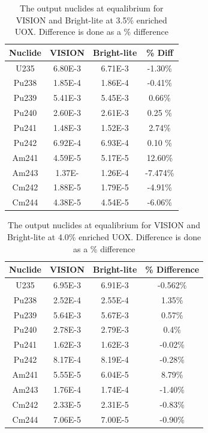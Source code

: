 \documentclass{article}
\begin{document}
\begin{table}[!htb]
\centering
\small
\caption{The output nuclides at equalibrium for VISION and Bright-lite at 3.5\% enriched UOX. Difference is done as a \% difference}
\label{tab:35}
\vspace{0.5em}
\begin{tabular}{cccc}
Nuclide &  VISION & Bright-lite & \% Diff \\
\hline
U235  & 6.80E-3 & 6.71E-3 & -1.30\%\\
Pu238 & 1.85E-4 & 1.86E-4 & -0.41\%\\
Pu239 & 5.41E-3 & 5.45E-3 & 0.66\%\\
Pu240 & 2.60E-3 & 2.61E-3 & 0.25 \%\\
Pu241 & 1.48E-3 & 1.52E-3 & 2.74\%\\
Pu242 & 6.92E-4 & 6.93E-4 & 0.10 \%\\
Am241 & 4.59E-5 & 5.17E-5 & 12.60\%\\
Am243 & 1.37E- & 1.26E-4 & -7.474\%\\
Cm242 & 1.88E-5 & 1.79E-5 & -4.91\%\\
Cm244 & 4.38E-5 & 4.54E-5 & -6.06\%\\
\end{tabular}
\end{table}

\begin{table}[!htb]
\centering
\small
\caption{The output nuclides at equalibrium for VISION and Bright-lite at 4.0\% enriched UOX. Difference is done as a \% difference}
\label{tab:40}
\vspace{0.5em}
\begin{tabular}{cccc}
Nuclide & VISION & Bright-lite & \% Difference \\
\hline
U235 & 6.95E-3 & 6.91E-3 & -0.562\%\\
Pu238 & 2.52E-4 & 2.55E-4 & 1.35\%\\
Pu239 & 5.64E-3 & 5.67E-3 & 0.57\%\\
Pu240 & 2.78E-3 & 2.79E-3 & 0.4\%\\
Pu241 & 1.62E-3  & 1.62E-3 & -0.02\%\\
Pu242 & 8.17E-4  & 8.19E-4 & -0.28\%\\
Am241 & 5.55E-5 & 6.04E-5 & 8.79\%\\
Am243 & 1.76E-4 & 1.74E-4 & -1.40\%\\
Cm242 & 2.33E-5 & 2.31E-5 & -0.83\%\\
Cm244 & 7.06E-5 & 7.00E-5 & -0.90\%\\
\end{tabular}
\end{table}
\end{document}
